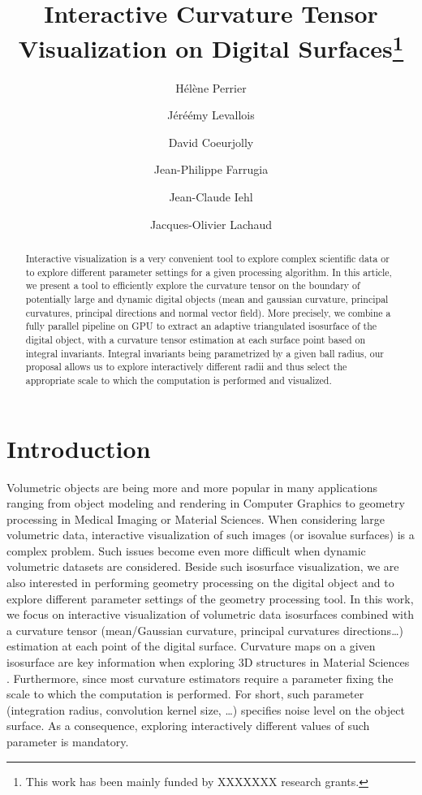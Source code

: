 \documentclass{llncs}
\title{Interactive Curvature Tensor Visualization on Digital
Surfaces\thanks{This work has been mainly funded by XXXXXXX research grants.}}
\author{H\'el\`ene Perrier\inst{1}\and J\'eré\'emy Levallois\inst{1,2}\and David
Coeurjolly\inst{1}\and Jean-Philippe Farrugia\inst{1}\and Jean-Claude
Iehl\inst{1}\and Jacques-Olivier Lachaud\inst{2} }
\institute{ Universit\'e de Lyon, CNRS\\
   LIRIS, UMR5205, F-69621, France
   \and
Universit\'e de Savoie, CNRS\\
LAMA, UMR5127, F-73776, France\\
}
\begin{document}
\maketitle


\begin{abstract}\sloppy
  Interactive visualization is a very convenient tool to explore
  complex scientific data or to explore different parameter settings
  for a given processing algorithm. In this article, we present a tool
  to efficiently explore the curvature tensor on the boundary of
  potentially large and dynamic digital objects (mean and gaussian curvature,
  principal curvatures, principal directions and normal vector
  field). More precisely, we combine a fully parallel pipeline on GPU
  to extract an adaptive triangulated isosurface of the digital
  object, with a curvature tensor estimation at each surface point
  based on integral invariants. Integral invariants being parametrized
  by a given ball radius, our proposal allows us to explore
  interactively different radii and thus select the appropriate scale
  to which the computation is performed and visualized.


\end{abstract}

\section{Introduction}
\label{sec:introduction}

Volumetric objects are being more and more popular in many
applications ranging from object modeling and rendering in Computer
Graphics to geometry processing in Medical Imaging or Material
Sciences. When considering large volumetric data, interactive
visualization of such images (or isovalue surfaces) is a complex
problem. Such issues become even more difficult when dynamic
volumetric datasets are considered. Beside such isosurface
visualization, we are also interested in performing geometry
processing on the digital object and to explore different parameter
settings of the geometry processing tool.  In this work, we focus on
interactive visualization of volumetric data isosurfaces combined with
a curvature tensor (mean/Gaussian curvature, principal curvatures
directions\ldots) estimation at each point of the digital
surface. Curvature maps on a given isosurface are key information when
exploring 3D structures in Material Sciences . Furthermore,
since most curvature estimators require a parameter fixing the scale
to which the computation is performed. For short, such parameter
(integration radius, convolution kernel size, \ldots) specifies noise
level on the object surface. As a consequence, exploring interactively
different values of such parameter is mandatory.
\end{document}

